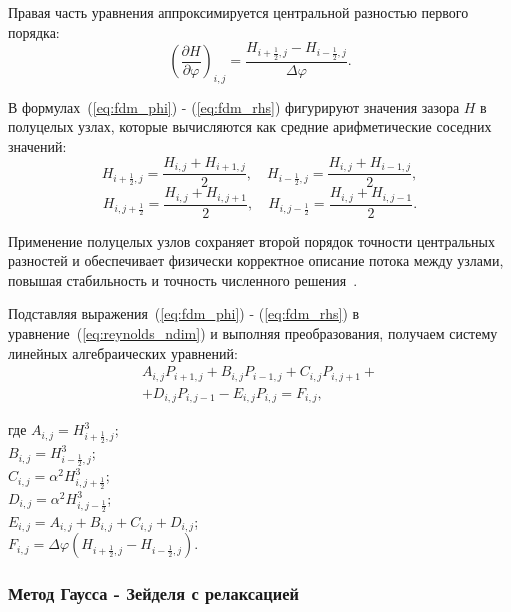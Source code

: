 Правая часть уравнения аппроксимируется центральной разностью первого порядка:
\begin{equation}
    \left(\frac{\partial H}{\partial\varphi}\right)_{i,j} = \frac{H_{i+\frac12,j} - H_{i-\frac12,j}}{\Delta\varphi}.
    \label{eq:fdm_rhs}
\end{equation}

В формулах~(\ref{eq:fdm_phi}) - (\ref{eq:fdm_rhs}) фигурируют значения зазора $H$ в полуцелых узлах, которые вычисляются как средние арифметические соседних значений:
\begin{equation}
    H_{i+\frac12,j} = \frac{H_{i,j} + H_{i+1,j}}{2}, \quad H_{i-\frac12,j} = \frac{H_{i,j} + H_{i-1,j}}{2},
    \label{eq:half_phi}
\end{equation}
\begin{equation}
    H_{i,j+\frac12} = \frac{H_{i,j} + H_{i,j+1}}{2}, \quad H_{i,j-\frac12} = \frac{H_{i,j} + H_{i,j-1}}{2}.
    \label{eq:half_z}
\end{equation}

Применение полуцелых узлов сохраняет второй порядок точности центральных разностей и обеспечивает физически корректное описание потока между узлами, повышая стабильность и точность численного решения~\cite{hamrock}.

Подставляя выражения~(\ref{eq:fdm_phi}) - (\ref{eq:fdm_rhs}) в уравнение~(\ref{eq:reynolds_ndim}) и выполняя преобразования, получаем систему линейных алгебраических уравнений:
\begin{equation}
    \begin{split}
    A_{i,j} P_{i+1,j} + B_{i,j} P_{i-1,j} + C_{i,j} P_{i,j+1} + {} \\
    + D_{i,j} P_{i,j-1} - E_{i,j} P_{i,j} = F_{i,j},
    \end{split}
    \label{eq:fdm}
\end{equation}

\noindent где $A_{i,j} = H_{i+\frac12,j}^3$;\\
\hphantom{где }$B_{i,j} = H_{i-\frac12,j}^3$;\\
\hphantom{где }$C_{i,j} = \alpha^2 H_{i,j+\frac12}^3$;\\
\hphantom{где }$D_{i,j} = \alpha^2 H_{i,j-\frac12}^3$;\\
\hphantom{где }$E_{i,j} = A_{i,j} + B_{i,j} + C_{i,j} + D_{i,j}$;\\
\hphantom{где }$F_{i,j} = \Delta\varphi(H_{i+\frac12,j} - H_{i-\frac12,j})$.

\subsubsection{Метод Гаусса - Зейделя с релаксацией}

